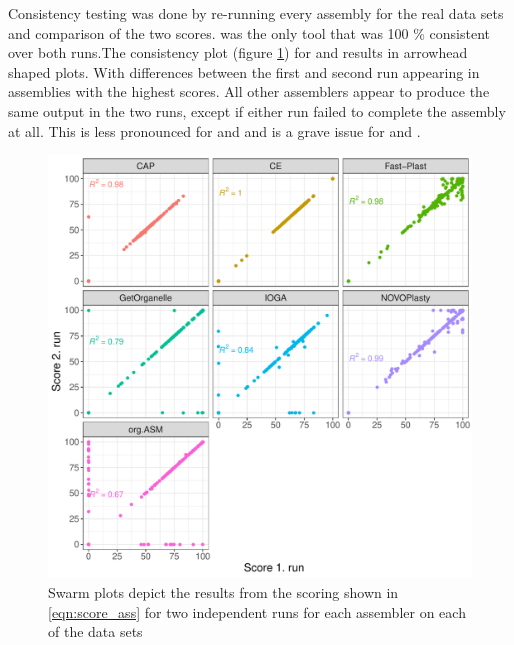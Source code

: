 Consistency testing was done by re-running every assembly for the real data sets and
comparison of the two scores. \ce \hspace{0.25ex} was the only tool that was 100 \%
consistent over both runs.The consistency plot (figure \ref{fig:consisplot}) for \fp
\hspace{0.25ex} and \np \hspace{0.25ex} results in arrowhead shaped plots. With
differences between the first and second run appearing in assemblies with the highest
scores. All other assemblers appear to produce the same output in the two runs, except if
either run failed to complete the assembly at all. This is less pronounced for \cassp
\hspace{0.25ex} and \go\hspace{0.25ex} and is a grave issue for \oa \hspace{0.25ex} and
\ioga.

\begin{figure}[H]
\centering
\includegraphics[height=.49\textheight, width=.95\textwidth]{Figures/repro}
\decoRule
\caption[Comparison between two runs with the same assembler for consistency testing
]{Swarm plots depict the results from the scoring shown in \ref{eqn:score_ass} for two
  independent runs for each assembler on each of the data sets}
\label{fig:consisplot}
\end{figure}


